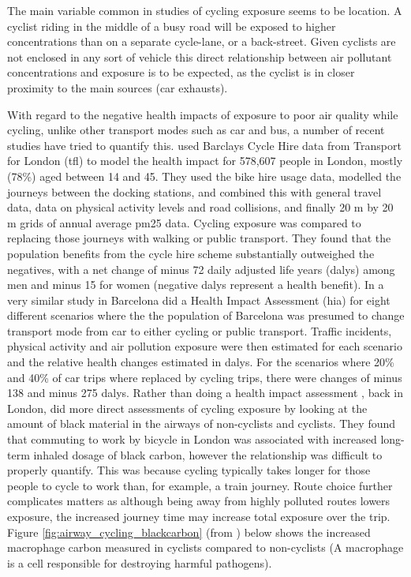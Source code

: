 The main variable common in studies of cycling exposure seems to be location. A cyclist riding in the middle of a busy road will be exposed to higher concentrations than on a separate cycle-lane, or a back-street. Given cyclists are not enclosed in any sort of vehicle this direct relationship between air pollutant concentrations and exposure is to be expected, as the cyclist is in closer proximity to the main sources (car exhausts).

With regard to the negative health impacts of exposure to poor air quality while cycling, unlike other transport modes such as car and bus, a number of recent studies have tried to quantify this. \cite{Woodcock2014} used Barclays Cycle Hire data from Transport for London (\gls{tfl}) to model the health impact for 578,607 people in London, mostly (78\%) aged between 14 and 45. They used the bike hire usage data, modelled the journeys between the docking stations, and combined this with general travel data, data on physical activity levels and road collisions, and finally 20 m by 20 m grids of annual average \gls{pm25} data. Cycling exposure was compared to replacing those journeys with walking or public transport. They found that the population benefits from the cycle hire scheme substantially outweighed the negatives, with a net change of minus 72 daily adjusted life years (\gls{daly}s) among men and minus 15 for women (negative \gls{daly}s represent a health benefit). In a very similar study in Barcelona \cite{Rojas-Rueda2013} did a Health Impact Assessment (\gls{hia}) for eight different scenarios where the the population of Barcelona was presumed to change transport mode from car to either cycling or public transport. Traffic incidents, physical activity and air pollution exposure were then estimated for each scenario and the relative health changes estimated in \gls{daly}s. For the scenarios where 20\% and 40\% of car trips where replaced by cycling trips, there were changes of minus 138 and minus 275 \gls{daly}s. Rather than doing a health impact assessment \cite{Nwokoro2012}, back in London, did more direct assessments of cycling exposure by looking at the amount of black material in the airways of non-cyclists and cyclists. They found that commuting to work by bicycle in London was associated with increased long-term inhaled dosage of black carbon, however the relationship was difficult to properly quantify. This was because cycling typically takes longer for those people to cycle to work than, for example, a train journey. Route choice further complicates matters as although being away from highly polluted routes lowers exposure, the increased journey time may increase total exposure over the trip. Figure \ref{fig:airway_cycling_blackcarbon} (from \cite{Nwokoro2012}) below shows the increased macrophage carbon measured in cyclists compared to non-cyclists (A macrophage is a cell responsible for destroying harmful pathogens).

